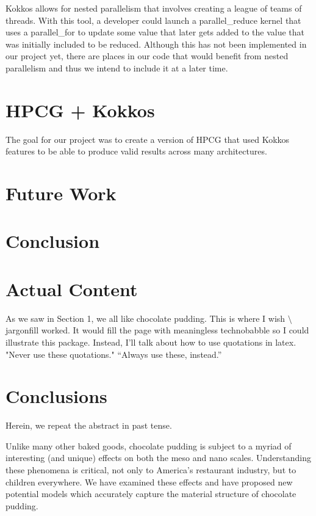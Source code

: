 \documentclass{ccr15}
\begin{document}
Kokkos allows for nested parallelism that involves creating a league of teams of threads.
With this tool, a developer could launch a parallel\_reduce kernel that uses a parallel\_for to
update some value that later gets added to the value that was initially included to be reduced.
Although this has not been implemented in our project yet, there are places in our code that
would benefit from nested parallelism and thus we intend to include it at a later time.

\section{HPCG + Kokkos}
The goal for our project was to create a version of HPCG that used Kokkos features to be able to
produce valid results across many architectures.

\section{Future Work}

\section{Conclusion}

\section{Actual Content}

As we saw in Section 1, we all like chocolate pudding. This is where I wish
\textsf{$\setminus$jargonfill} worked. It would fill the page with meaningless technobabble so I could illustrate this
package. Instead, I'll talk about how to use quotations in latex. "Never use these quotations." ``Always use these,
instead.''

\section{Conclusions}
Herein, we repeat the abstract in past tense.

Unlike many other baked goods, chocolate pudding is subject to a myriad of interesting (and unique) effects on both the
meso and nano scales.  Understanding these phenomena is critical, not only to America's restaurant industry, but to
children everywhere.  We have examined these effects and have proposed new potential models which accurately capture
the material structure of chocolate pudding.


\nocite{ZAB:Mentor05}
\nocite{ZAB:TechHPCG}


%
\end{document}
